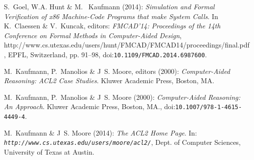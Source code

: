 \documentclass[submission,copyright,creativecommons]{eptcs}
\providecommand{\urlalt}[2]{\href{#1}{#2}}
\providecommand{\doi}[1]{doi:\urlalt{http://dx.doi.org/#1}{#1}}
\begin{document}
\begin{thebibliography}{10}
\providecommand{\bibitemdeclare}[2]{}
\providecommand{\surnamestart}{}
\providecommand{\surnameend}{}
\providecommand{\urlprefix}{Available at }
\providecommand{\url}[1]{\texttt{#1}}
\providecommand{\href}[2]{\texttt{#2}}
\providecommand{\urlalt}[2]{\href{#1}{#2}}
\providecommand{\doi}[1]{doi:\urlalt{http://dx.doi.org/#1}{#1}}
\providecommand{\bibinfo}[2]{#2}

\bibitemdeclare{inproceedings}{fmcad14}
\bibinfo{author}{S.~\surnamestart Goel\surnameend}, \bibinfo{author}{W.A.
  \surnamestart Hunt\surnameend} \& \bibinfo{author}{M.~\surnamestart
  Kaufmann\surnameend} (\bibinfo{year}{2014}): \emph{\bibinfo{title}{Simulation
  and Formal Verification of x86 Machine-Code Programs that make System
  Calls}}.
\newblock In \bibinfo{editor}{K.~\surnamestart Claessen\surnameend} \&
  \bibinfo{editor}{V.~\surnamestart Kuncak\surnameend}, editors: {\sl
  \bibinfo{booktitle}{\em{FMCAD'14: Proceedings of the 14th Conference on
  Formal Methods in Computer-Aided Design}}},
  \bibinfo{volume}{http://www.cs.utexas.edu/users/hunt/FMCAD/FMCAD14/proceedings/final.pdf},
  \bibinfo{publisher}{EPFL, Switzerland}, pp. \bibinfo{pages}{91--98}, \doi{10.1109/FMCAD.2014.6987600}.

\bibitemdeclare{book}{acs}
\bibinfo{editor}{M.~\surnamestart Kaufmann\surnameend},
  \bibinfo{editor}{P.~\surnamestart Manolios\surnameend} \&
  \bibinfo{editor}{J~S. \surnamestart Moore\surnameend}, editors
  (\bibinfo{year}{2000}): \emph{\bibinfo{title}{{Computer-Aided Reasoning:
  {ACL2} Case Studies}}}.
\newblock \bibinfo{publisher}{Kluwer Academic Press}, \bibinfo{address}{Boston,
  MA.}

\bibitemdeclare{book}{car}
\bibinfo{author}{M.~\surnamestart Kaufmann\surnameend},
  \bibinfo{author}{P.~\surnamestart Manolios\surnameend} \&
  \bibinfo{author}{J~S. \surnamestart Moore\surnameend} (\bibinfo{year}{2000}):
  \emph{\bibinfo{title}{{Computer-Aided Reasoning: An Approach}}}.
\newblock \bibinfo{publisher}{Kluwer Academic Press}, \bibinfo{address}{Boston,
  MA.}, \doi{10.1007/978-1-4615-4449-4}.

\bibitemdeclare{inproceedings}{acl2-home-page}
\bibinfo{author}{M.~\surnamestart Kaufmann\surnameend} \& \bibinfo{author}{J~S.
  \surnamestart Moore\surnameend} (\bibinfo{year}{2014}):
  \emph{\bibinfo{title}{The {ACL2} Home Page}}.
\newblock In: {\sl
  \bibinfo{booktitle}{\url{http://www.cs.utexas.edu/users/moore/acl2/}}},
  \bibinfo{publisher}{Dept. of Computer Sciences, University of Texas at
  Austin}.


\end{thebibliography}
\end{document}
